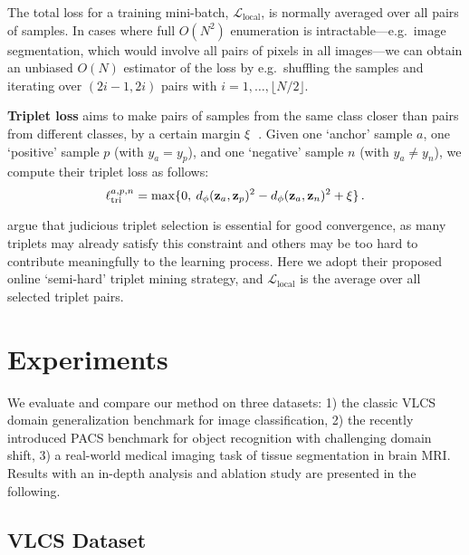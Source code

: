 \documentclass{article}
\newcommand{\MetricLoss}{\mathcal{L}_\mathrm{local}}
\def\*#1{\mathbf{#1}}
\newcommand{\changed}[1]{\textcolor{red}{#1}}
\begin{document}
The total loss for a training mini-batch, $\MetricLoss$, is normally averaged over all pairs of samples. In cases where full $O(N^2)$ enumeration is intractable---e.g.\ image segmentation, which would involve all pairs of pixels in all images---we can obtain an unbiased $O(N)$ estimator of the loss by e.g.\ shuffling the samples and iterating over $(2i-1,2i)$ pairs with $i=1,\dots,\lfloor N/2\rfloor$.
\changed{}



\vspace{1mm}

\textbf{Triplet loss} aims to make pairs of samples from the same class closer than pairs from different classes, by a certain margin $\xi$~\citep{schroff2015facenet}. Given one `anchor' sample $a$, one `positive' sample $p$ (with $y_a=y_p$), and one `negative' sample $n$ (with $y_a\neq y_n$), we compute their triplet loss as follows:
\begin{equation}
    \ell_\mathrm{tri}^{a,p,n} = \max\{0,\: d_\phi(\*z_a, \*z_p)^2 - d_\phi(\*z_a, \*z_n)^2 + \Margin\} \,.
\end{equation}

 argue that judicious triplet selection is essential for good convergence, as many triplets may already satisfy this constraint and others may be too hard to contribute meaningfully to the learning process. Here we adopt their proposed online `semi-hard' triplet mining strategy, and $\MetricLoss$ is the average over all selected triplet pairs.
 
\section{Experiments}

We evaluate and compare our method on three datasets: 1) the classic VLCS domain generalization benchmark for image classification, 2) the recently introduced PACS benchmark for object recognition with challenging domain shift, 3) a real-world medical imaging task of tissue segmentation in brain MRI. Results with an in-depth analysis and ablation study are presented in the following.

\subsection{VLCS Dataset}
\end{document}
